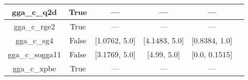 \begin{tabular}{|c|c|c|c|c|l|}
     gga\_c\_q2d &                  True &              --- &           --- &            --- &                              \cite{Chiodo2012_126402} \\ \hline
    gga\_c\_rge2 &                  True &              --- &           --- &            --- &                             \cite{Ruzsinszky2009_763} \\ \hline
     gga\_c\_sg4 &                 False &    [1.0762, 5.0] & [4.1483, 5.0] &  [0.8384, 1.0] &                          \cite{Constantin2016_045126} \\ \hline
 gga\_c\_sogga11 &                 False &    [3.1769, 5.0] &   [4.99, 5.0] &  [0.0, 0.1515] &                              \cite{Peverati2011_1991} \\ \hline
    gga\_c\_xpbe &                  True &              --- &           --- &            --- &                                    \cite{Xu2004_4068} \\ \hline
\end{tabular}